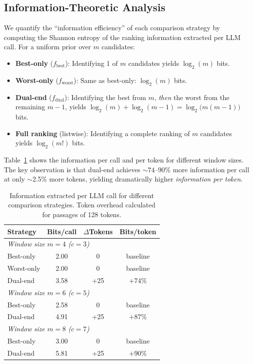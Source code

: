 \subsection{Information-Theoretic Analysis}
\label{sec:information}

We quantify the ``information efficiency'' of each comparison strategy by computing the Shannon entropy of the ranking information extracted per LLM call. For a uniform prior over $m$ candidates:

\begin{itemize}[leftmargin=*]
\item \textbf{Best-only} ($f_{\text{best}}$): Identifying 1 of $m$ candidates yields $\log_2(m)$ bits.
\item \textbf{Worst-only} ($f_{\text{worst}}$): Same as best-only: $\log_2(m)$ bits.
\item \textbf{Dual-end} ($f_{\text{dual}}$): Identifying the best from $m$, \emph{then} the worst from the remaining $m-1$, yields $\log_2(m) + \log_2(m-1) = \log_2\bigl(m(m-1)\bigr)$ bits.
\item \textbf{Full ranking} (listwise): Identifying a complete ranking of $m$ candidates yields $\log_2(m!)$ bits.
\end{itemize}

Table~\ref{tab:infobits} shows the information per call and per token for different window sizes. The key observation is that dual-end achieves $\sim$$74$--$90$\% more information per call at only $\sim$2.5\% more tokens, yielding dramatically higher \emph{information per token}.

\begin{table}[!htbp]
\caption{Information extracted per LLM call for different comparison strategies. Token overhead calculated for passages of 128 tokens.}
\label{tab:infobits}
\small
\begin{tabular}{lccc}
\toprule
\textbf{Strategy} & \textbf{Bits/call} & \textbf{$\Delta$Tokens} & \textbf{Bits/token} \\
\midrule
\multicolumn{4}{l}{\textit{Window size $m=4$ ($c=3$)}} \\
Best-only & 2.00 & 0 & baseline \\
Worst-only & 2.00 & 0 & baseline \\
Dual-end & 3.58 & +25 & $+74$\% \\
\midrule
\multicolumn{4}{l}{\textit{Window size $m=6$ ($c=5$)}} \\
Best-only & 2.58 & 0 & baseline \\
Dual-end & 4.91 & +25 & $+87$\% \\
\midrule
\multicolumn{4}{l}{\textit{Window size $m=8$ ($c=7$)}} \\
Best-only & 3.00 & 0 & baseline \\
Dual-end & 5.81 & +25 & $+90$\% \\
\bottomrule
\end{tabular}
\end{table}

